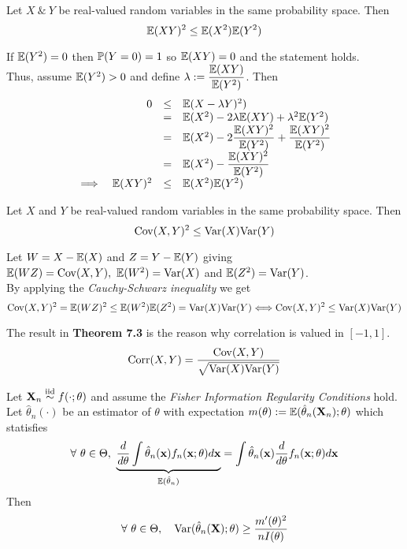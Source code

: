 \documentclass[11pt,a4paper]{article}
\begin{document}
Let $X\ \&\ Y$ be real-valued random variables in the same probability space. Then
$$\mathbb{E}(XY)^2\leq\mathbb{E}(X^2)\mathbb{E}(Y^2)$$

If $\mathbb{E}(Y^2)=0$ then $\mathbb{P}(Y=0)=1$ so $\mathbb{E}(XY)=0$ and the statement holds.\\
Thus, assume $\mathbb{E}(Y^2)>0$ and define $\lambda:=\dfrac{\mathbb{E}(XY)}{\mathbb{E}(Y^2)}$. Then
\[\begin{array}{rrcl}
&0&\leq&\mathbb{E}(X-\lambda Y)^2)\\
&&=&\mathbb{E}(X^2)-2\lambda\mathbb{E}(XY)+\lambda^2\mathbb{E}(Y^2)\\
&&=&\mathbb{E}(X^2)-2\dfrac{\mathbb{E}(XY)^2}{\mathbb{E}(Y^2)}+\dfrac{\mathbb{E}(XY)^2}{\mathbb{E}(Y^2)}\\
&&=&\mathbb{E}(X^2)-\dfrac{\mathbb{E}(XY)^2}{\mathbb{E}(Y^2)}\\
\implies&\mathbb{E}(XY)^2&\leq&\mathbb{E}(X^2)\mathbb{E}(Y^2)
\end{array}\]
\proved

Let $X$ and $Y$ be real-valued random variables in the same probability space. Then
$$\mathrm{Cov}(X,Y)^2\leq\mathrm{Var}(X)\mathrm{Var}(Y)$$

Let $W=X-\mathbb{E}(X)$ and $Z=Y-\mathbb{E}(Y)$ giving $\expect(WZ)=\cov(X,Y),\ \expect(W^2)=\var(X)$ and $\mathbb{E}(Z^2)=\mathrm{Var}(Y)$.\\
By applying the \textit{Cauchy-Schwarz inequality} we get
$$\mathrm{Cov}(X,Y)^2=\mathbb{E}(WZ)^2\leq\mathbb{E}(W^2)\mathbb{E}(Z^2)=\mathrm{Var}(X)\mathrm{Var}(Y)\Longleftrightarrow\mathrm{Cov}(X,Y)^2\leq\mathrm{Var}(X)\mathrm{Var}(Y)$$

The result in \textbf{Theorem 7.3} is the reason why correlation is valued in $[-1,1]$.
$$\text{Corr}(X,Y)=\dfrac{\mathrm{Cov}(X,Y)}{\sqrt{\mathrm{Var}(X)\mathrm{Var}(Y)}}$$

Let $\textbf{X}_n\overset{\text{iid}}{\sim} f(\cdot;\theta)$ and assume the \textit{Fisher Information Regularity Conditions} hold.\\
Let $\hat{\theta}_n(\cdot)$ be an estimator of $\theta$ with expectation $m(\theta):=\mathbb{E}(\hat{\theta}_n(\textbf{X}_n);\theta)$ which statisfies
$$\forall\ \theta\in\Theta,\ \underbrace{\frac{d}{d\theta}\int\hat{\theta}_n(\x)f_n(\x;\theta)d\x}_{\expect(\hat{\theta}_n)}=\int\hat{\theta}_n(\x)\frac{d}{d\theta}f_n(\x;\theta)d\x$$
Then
$$\forall\ \theta\in\Theta,\quad\var(\hat{\theta}_n(\X);\theta)\geq\frac{m'(\theta)^2}{nI(\theta)}$$
\end{document}
